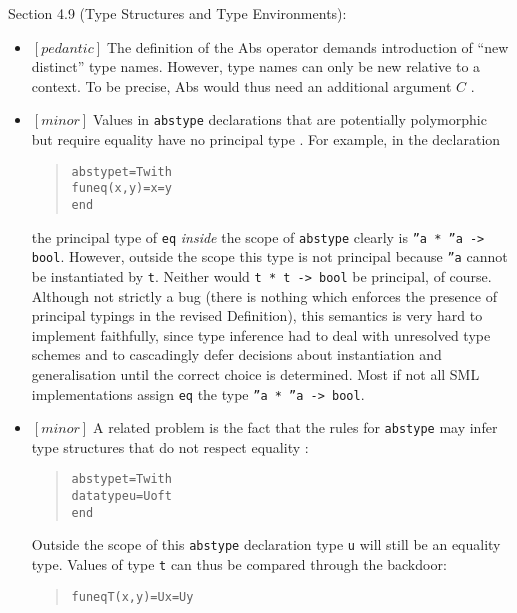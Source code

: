 \documentclass{article}
\newcommand{\m}[1]{$[\mathit{#1}]\;$}
\newcommand{\minor}{\m{minor}}
\newcommand{\pedantic}{\m{pedantic}}
\begin{document}
Section 4.9 (Type Structures and Type Environments):
\nopagebreak

\begin{itemize}
\item \pedantic The definition of the Abs operator demands introduction of ``new distinct'' type names. However, type names can only be new relative to a context. To be precise, Abs would thus need an additional argument $C$ \cite{addenda}.

\item \minor Values in {\tt abstype} declarations that are potentially polymorphic but require equality have no principal type \cite{addenda}. For example, in the declaration
\begin{quote}
\begin{alltt}
abstype t = T with
    fun eq(x, y) = x = y
end
\end{alltt}
\end{quote}
the principal type of {\tt eq} {\em inside} the scope of {\tt abstype} clearly is {\tt ''a * ''a -> bool}. However, outside the scope this type is not principal because {\tt ''a} cannot be instantiated by {\tt t}. Neither would {\tt t * t -> bool} be principal, of course. Although not strictly a bug (there is nothing which enforces the presence of principal typings in the revised Definition), this semantics is very hard to implement faithfully, since type inference had to deal with unresolved type schemes and to cascadingly defer decisions about instantiation and generalisation until the correct choice is determined. Most if not all SML implementations assign {\tt eq} the type {\tt ''a * ''a -> bool}.

\item \minor A related problem is the fact that the rules for {\tt abstype} may infer type structures that do not respect equality \cite{addenda}:
\begin{quote}
\begin{alltt}
abstype t = T with
    datatype u = U of t
end
\end{alltt}
\end{quote}
Outside the scope of this {\tt abstype} declaration type {\tt u} will still be an equality type. Values of type {\tt t} can thus be compared through the backdoor:
\begin{quote}
\begin{alltt}
fun eqT(x, y) = U x = U y
\end{alltt}
\end{quote}
\end{itemize}
\end{document}
